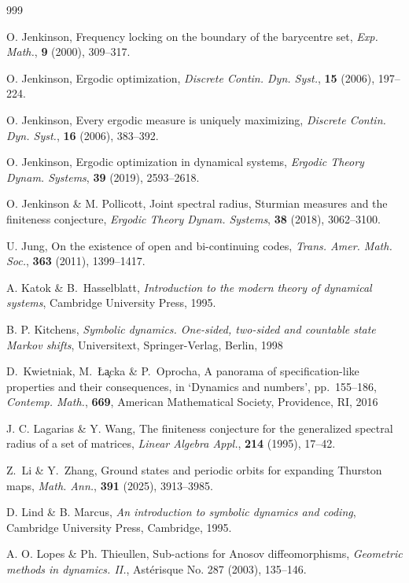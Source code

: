 \documentclass[reqno,11pt]{amsart}
\theoremstyle{definition}
\theoremstyle{remark}
\theoremstyle{remark}
\numberwithin{equation}{section}
\begin{document}
\begin{thebibliography}{999}
 
O. Jenkinson,
Frequency locking on the boundary of the barycentre set,
{\it Exp. Math.}, {\bf 9} (2000), 309--317.
	
	O. Jenkinson, Ergodic optimization, {\it  Discrete Contin. Dyn. Syst.}, {\bf 15} (2006), 197--224.
	
 O. Jenkinson,
Every ergodic measure is uniquely maximizing,
{\it  Discrete Contin. Dyn. Syst.}, {\bf 16} (2006), 383--392.

	O. Jenkinson, Ergodic optimization in dynamical systems, 
{\it Ergodic Theory Dynam. Systems}, {\bf 39} (2019), 2593--2618.

 O. Jenkinson \& M. Pollicott, 
Joint spectral radius, Sturmian measures and the finiteness conjecture,
{\it Ergodic Theory Dynam. Systems}, {\bf 38} (2018), 3062--3100.



U. Jung,
On the existence of open and bi-continuing codes,
{\it Trans. Amer. Math. Soc.}, {\bf 363} (2011), 1399--1417.


 A. Katok \& B.~Hasselblatt, {\it Introduction to the modern theory of dynamical systems},
Cambridge University Press, 1995.

 B. P. Kitchens, 
{\it Symbolic dynamics.
One-sided, two-sided and countable state Markov shifts},
Universitext,
Springer-Verlag, Berlin, 1998


D.~Kwietniak, M.~\L\c{a}cka \& P.~Oprocha, 
A panorama of specification-like properties and their consequences,
in `Dynamics and numbers', pp.~155–186,
{\it Contemp. Math.}, {\bf 669},
American Mathematical Society, Providence, RI, 2016
	

J. C. Lagarias \& Y. Wang,
The finiteness conjecture for the generalized spectral radius of a set of matrices,
{\it Linear Algebra Appl.}, {\bf 214} (1995), 17--42.


 Z.~Li \& Y.~Zhang,
Ground states and periodic orbits for expanding Thurston maps,
{\it Math. Ann.}, 
{\bf 391} (2025), 3913--3985.


	 D. Lind \& B. Marcus, {\it An introduction to symbolic dynamics and coding},
 Cambridge University Press, Cambridge, 1995.
	
	 A. O. Lopes \& Ph. Thieullen, Sub-actions for Anosov diffeomorphisms,
{\it Geometric methods in dynamics. II.}, Ast\'{e}risque No. 287
(2003),  135--146.



\end{thebibliography}
\end{document}
